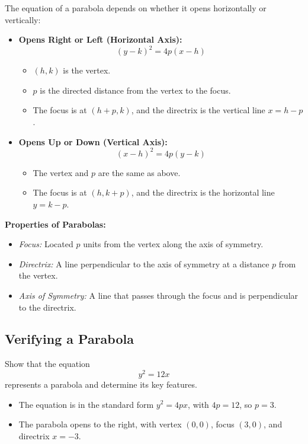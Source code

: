\documentclass{article}
\begin{document}
\begin{definitionbox}
The equation of a parabola depends on whether it opens horizontally or vertically:

\begin{itemize}
    \item \textbf{Opens Right or Left (Horizontal Axis):}  
    \[
    (y-k)^2 = 4p(x-h)
    \]
    \begin{itemize}
        \item \( (h, k) \) is the vertex.
        \item \( p \) is the directed distance from the vertex to the focus.
        \item The focus is at \( (h+p, k) \), and the directrix is the vertical line \( x = h - p \).
    \end{itemize}

    \item \textbf{Opens Up or Down (Vertical Axis):}  
    \[
    (x-h)^2 = 4p(y-k)
    \]
    \begin{itemize}
        \item The vertex and \( p \) are the same as above.
        \item The focus is at \( (h, k+p) \), and the directrix is the horizontal line \( y = k - p \).
    \end{itemize}
\end{itemize}
\begin{remarkbox}
    \textbf{Properties of Parabolas:}
    \begin{itemize}
        \item \textit{Focus:} Located \( p \) units from the vertex along the axis of symmetry.
        \item \textit{Directrix:} A line perpendicular to the axis of symmetry at a distance \( p \) from the vertex.
        \item \textit{Axis of Symmetry:} A line that passes through the focus and is perpendicular to the directrix.
    \end{itemize}
    \end{remarkbox}
\end{definitionbox}

\subsection*{Verifying a Parabola}
\begin{examplebox}  
Show that the equation  
\[
y^2 = 12x
\]
represents a parabola and determine its key features.

\begin{solutionbox}
\begin{itemize}
    \item The equation is in the standard form \( y^2 = 4px \), with \( 4p = 12 \), so \( p = 3 \).
    \item The parabola opens to the right, with vertex \( (0, 0) \), focus \( (3, 0) \), and directrix \( x = -3 \).
\end{itemize}
\end{solutionbox}
\end{examplebox}
\end{document}
